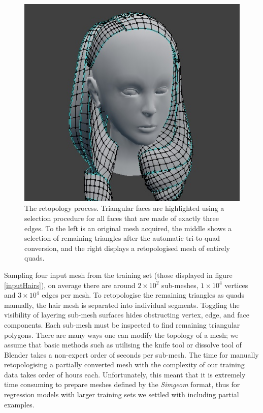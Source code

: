 \documentclass[ %
author={Dillon Keith Diep},
supervisor={Dr. Carl Henrik Ek},
degree={MEng},
title={ART-CG Hair:},
subtitle={Assisted Real-time Content Generation of Stylised Virtual Hair},
type={Research},
year={2017} ]{dissertation}
\begin{document}
\begin{figure}[!h]
	\includegraphics[scale=2]{images/triToQuad3}
	\caption{The retopology process. Triangular faces are highlighted using a selection procedure for all faces that are made of exactly three edges. To the left is an original mesh acquired, the middle shows a selection of remaining triangles after the automatic tri-to-quad conversion, and the right displays a retopologised mesh of entirely quads.}
	\label{fig:triToQuad}
\end{figure}

Sampling four input mesh from the training set (those displayed in figure \ref{inputHairs}), on average there are around $2 \times 10^{2}$ sub-meshes, $1 \times 10^{4}$ vertices and  $3 \times 10^{4}$ edges per mesh. To retopologise the remaining triangles as quads manually, the hair mesh is separated into individual segments. Toggling the visibility of layering sub-mesh surfaces hides obstructing vertex, edge, and face components. Each sub-mesh must be inspected to find remaining triangular polygons. There are many ways one can modify the topology of a mesh; we assume that basic methods such as utilising the knife tool or dissolve tool of Blender takes a non-expert order of seconds per sub-mesh. The time for manually retopologising a partially converted mesh with the complexity of our training data takes order of hours each. Unfortunately, this meant that it is extremely time consuming to prepare meshes defined by the \textit{Simgeom} format, thus for regression models with larger training sets we settled with including partial examples.
\end{document}
